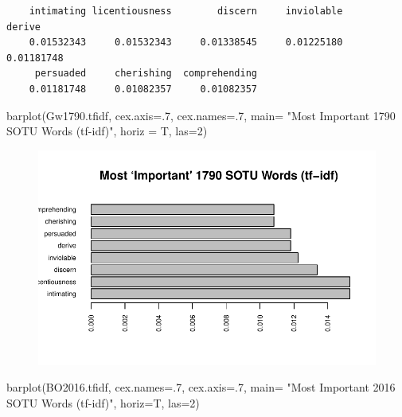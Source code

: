 \documentclass[
  letterpaper,
  DIV=11,
  numbers=noendperiod]{scrreprt}
\newenvironment{Shaded}{\begin{snugshade}}{\end{snugshade}}
\newcommand{\AttributeTok}[1]{\textcolor[rgb]{0.40,0.45,0.13}{#1}}
\newcommand{\DecValTok}[1]{\textcolor[rgb]{0.68,0.00,0.00}{#1}}
\newcommand{\FunctionTok}[1]{\textcolor[rgb]{0.28,0.35,0.67}{#1}}
\newcommand{\NormalTok}[1]{\textcolor[rgb]{0.00,0.23,0.31}{#1}}
\newcommand{\StringTok}[1]{\textcolor[rgb]{0.13,0.47,0.30}{#1}}
\begin{document}
\begin{verbatim}
    intimating licentiousness        discern     inviolable         derive 
    0.01532343     0.01532343     0.01338545     0.01225180     0.01181748 
     persuaded     cherishing  comprehending 
    0.01181748     0.01082357     0.01082357 
\end{verbatim}

\begin{Shaded}
\begin{Highlighting}[]
\FunctionTok{barplot}\NormalTok{(Gw1790.tfidf, }\AttributeTok{cex.axis=}\NormalTok{.}\DecValTok{7}\NormalTok{,}
         \AttributeTok{cex.names=}\NormalTok{.}\DecValTok{7}\NormalTok{,}
        \AttributeTok{main=} \StringTok{"Most \textasciigrave{}Important\textquotesingle{} 1790 SOTU Words (tf{-}idf)"}\NormalTok{, }
        \AttributeTok{horiz =}\NormalTok{ T, }\AttributeTok{las=}\DecValTok{2}\NormalTok{)}
\end{Highlighting}
\end{Shaded}

\begin{figure}[H]

{\centering \includegraphics{11-TextasData_files/figure-pdf/unnamed-chunk-15-1.pdf}

}

\end{figure}

\begin{Shaded}
\begin{Highlighting}[]
\FunctionTok{barplot}\NormalTok{(BO2016.tfidf,}
         \AttributeTok{cex.names=}\NormalTok{.}\DecValTok{7}\NormalTok{, }\AttributeTok{cex.axis=}\NormalTok{.}\DecValTok{7}\NormalTok{,}
        \AttributeTok{main=} \StringTok{"Most \textasciigrave{}Important\textquotesingle{} 2016 SOTU Words (tf{-}idf)"}\NormalTok{, }
        \AttributeTok{horiz=}\NormalTok{T, }\AttributeTok{las=}\DecValTok{2}\NormalTok{)}
\end{Highlighting}
\end{Shaded}
\end{document}
